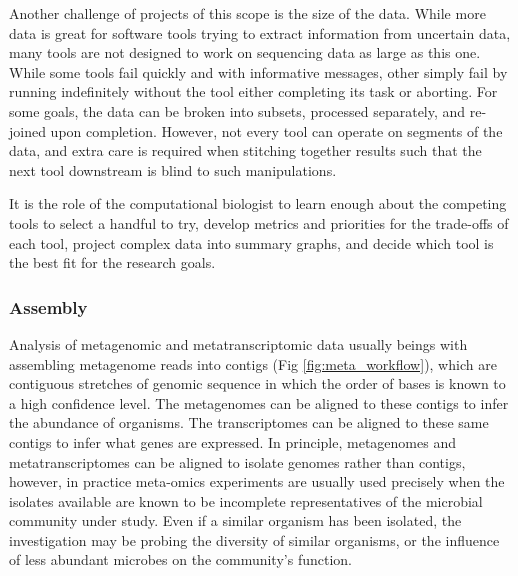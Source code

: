 Another challenge of projects of this scope is the size of the data.
While more data is great for software tools trying to extract information from uncertain data, many tools are not designed to work on sequencing data as large as this one.
While some tools fail quickly and with informative messages, other simply fail by running indefinitely without the tool either completing its task or aborting.
For some goals, the data can be broken into subsets, processed separately, and re-joined upon completion.
However, not every tool can operate on segments of the data, and extra care is required when stitching together results such that the next tool downstream is blind to such manipulations.


It is the role of the computational biologist to learn enough about the competing tools to select a handful to try, develop metrics and priorities for the trade-offs of each tool, project complex data into summary graphs, and decide which tool is the best fit for the research goals.

\subsubsection{Assembly}
Analysis of metagenomic and metatranscriptomic data usually beings with assembling metagenome reads into contigs (Fig \ref{fig:meta_workflow}), which are contiguous stretches of genomic sequence in which the order of bases is known to a high confidence level. %
The metagenomes can be aligned to these contigs to infer the abundance of organisms.
The transcriptomes can be aligned to these same contigs to infer what genes are expressed.
In principle, metagenomes and metatranscriptomes can be aligned to isolate genomes rather than contigs, however, in practice meta-omics experiments are usually used precisely when the isolates available are known to be incomplete representatives of the microbial community under study.
Even if a similar organism has been isolated, the investigation may be probing the diversity of similar organisms, or the influence of less abundant microbes on the community's function.

